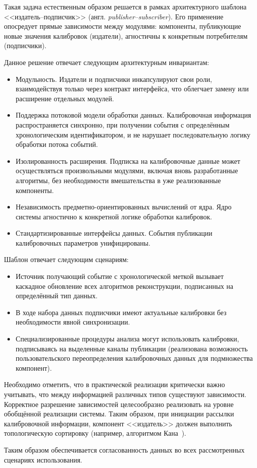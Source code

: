 Такая задача естественным образом решается в рамках архитектурного
шаблона <<издатель--подписчик>> (англ. \emph{publisher--subscriber}).
Его применение опосредует прямые зависимости между
модулями: компоненты, публикующие новые значения калибровок
(издатели), агностичны к конкретным потребителям (подписчики).

Данное решение отвечает следующим архитектурным инвариантам:
\begin{itemize}
    \item Модульность. Издатели и подписчики инкапсулируют свои роли,
    взаимодействуя только через контракт интерфейса, что облегчает
    замену или расширение отдельных модулей.
    \item Поддержка потоковой модели обработки данных.
    Калибровочная информация распространяется синхронно, при получении
    события с определённым хронологическим идентификатором, и
    не нарушает последовательную логику обработки потока
    событий.  %
    \item Изолированность расширения. Подписка на калибровочные
    данные может осуществляться произвольными модулями, включая
    вновь разработанные алгоритмы, без необходимости
    вмешательства в уже реализованные компоненты.
    \item Независимость предметно-ориентированных вычислений от
    ядра. Ядро системы агностично к конкретной логике обработки
    калибровок.
    \item Стандартизированные интерфейсы данных. События публикации
    калибровочных параметров унифицированы.
\end{itemize}

Шаблон отвечает следующим сценариям:
\begin{itemize}
    \item Источник получающий событие с хронологической меткой
    вызывает каскадное обновление всех алгоритмов реконструкции,
    подписанных на определённый тип данных.
    \item В ходе набора данных подписчики имеют актуальные
    калибровки без необходимости явной синхронизации.
    \item Специализированные процедуры анализа могут использовать
    калибровки, подписываясь на выделенные каналы
    публикации (реализована возможность пользовательского
    переопределения калибровочных данных для подмножества компонент).
\end{itemize}

Необходимо отметить, что в практической реализации критически важно
учитывать, что между информацией различных типов существуют
зависимости. Корректное разрешение зависимостей целесообразно
реализовать на уровне обобщённой реализации системы. Таким образом, при
инициации рассылки калибровочной информации, компонент <<издатель>> должен
выполнить топологическую сортировку (например, алгоритмом
Кана~\cite{kahn-tsort}).

Таким образом обеспечивается согласованность данных во всех
рассмотренных сценариях использования.
